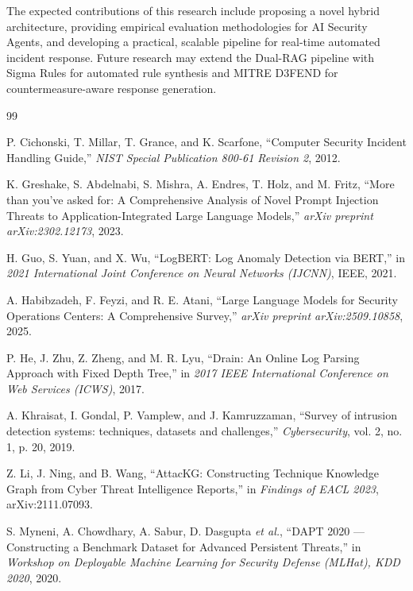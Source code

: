 \documentclass[12pt,a4paper]{article}
\begin{document}
The expected contributions of this research include proposing a novel hybrid architecture, providing empirical evaluation methodologies for AI Security Agents, and developing a practical, scalable pipeline for real-time automated incident response. Future research may extend the Dual-RAG pipeline with Sigma Rules for automated rule synthesis and MITRE D3FEND for countermeasure-aware response generation.

\newpage
{}
\begin{thebibliography}{99}

    P. Cichonski, T. Millar, T. Grance, and K. Scarfone, ``Computer Security Incident Handling Guide,'' \emph{NIST Special Publication 800-61 Revision 2}, 2012.

    K. Greshake, S. Abdelnabi, S. Mishra, A. Endres, T. Holz, and M. Fritz, ``More than you've asked for: A Comprehensive Analysis of Novel Prompt Injection Threats to Application-Integrated Large Language Models,'' \emph{arXiv preprint arXiv:2302.12173}, 2023.

    H. Guo, S. Yuan, and X. Wu, ``LogBERT: Log Anomaly Detection via BERT,'' in \emph{2021 International Joint Conference on Neural Networks (IJCNN)}, IEEE, 2021.

    A. Habibzadeh, F. Feyzi, and R. E. Atani, ``Large Language Models for Security Operations Centers: A Comprehensive Survey,'' \emph{arXiv preprint arXiv:2509.10858}, 2025.

    P. He, J. Zhu, Z. Zheng, and M. R. Lyu, ``Drain: An Online Log Parsing Approach with Fixed Depth Tree,'' in \emph{2017 IEEE International Conference on Web Services (ICWS)}, 2017.

    A. Khraisat, I. Gondal, P. Vamplew, and J. Kamruzzaman, ``Survey of intrusion detection systems: techniques, datasets and challenges,'' \emph{Cybersecurity}, vol. 2, no. 1, p. 20, 2019.

    Z. Li, J. Ning, and B. Wang, ``AttacKG: Constructing Technique Knowledge Graph from Cyber Threat Intelligence Reports,'' in \emph{Findings of EACL 2023}, arXiv:2111.07093.

    S. Myneni, A. Chowdhary, A. Sabur, D. Dasgupta \emph{et al.}, ``DAPT 2020 --- Constructing a Benchmark Dataset for Advanced Persistent Threats,'' in \emph{Workshop on Deployable Machine Learning for Security Defense (MLHat), KDD 2020}, 2020.


\end{thebibliography}
\end{document}
